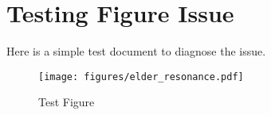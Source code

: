 \documentclass{article}
\begin{document}
\section{Testing Figure Issue}

Here is a simple test document to diagnose the issue.

\begin{figure}[htbp]
\centering
\texttt{[image: figures/elder\_resonance.pdf]}
\caption{Test Figure}
\label{fig:test}
\end{figure}
\end{document}
